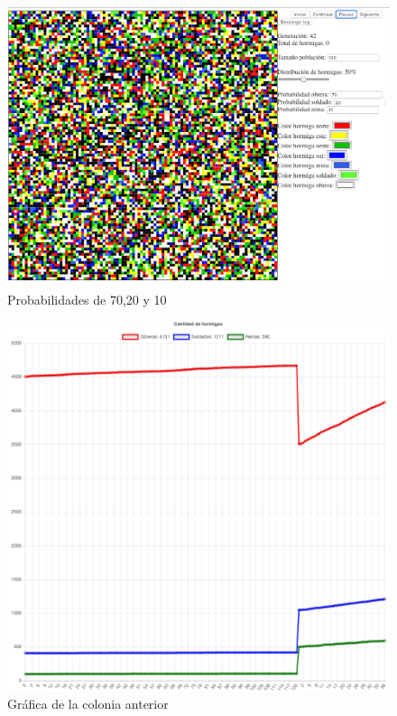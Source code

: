 		\begin{figure}[H]
			\begin{center}
				\includegraphics[scale=.3]{HL/img/mod2-1.png}
				\caption{Probabilidades de 70,20 y 10}
				\label{fig:hl1}
			\end{center}
		\end{figure}

		\begin{figure}[H]
			\begin{center}
				\includegraphics[scale=.24]{HL/img/mod2-2.png}
				\caption{Gráfica de la colonia anterior}
				\label{fig:hl1}
			\end{center}
		\end{figure}

